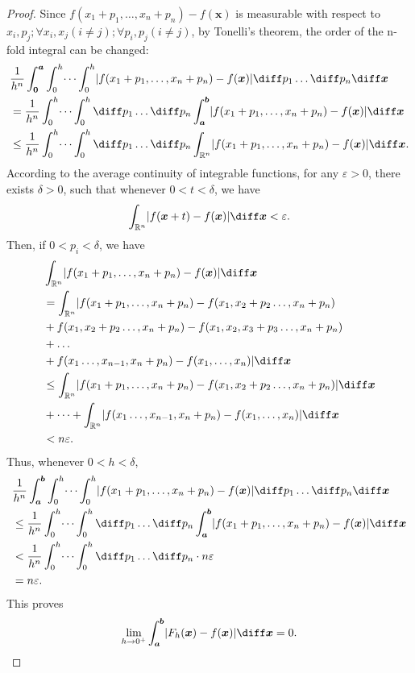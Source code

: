 \documentclass{ijclclp}
\begin{document}
\begin{proof}
    Since \(f(x_1+p_1,\dots,x_n+p_n)-f(\boldsymbol{x})\) is measurable with respect to \(x_i,p_j;\forall x_i,x_j(i\neq j);\forall p_i,p_j(i\neq j)\), by Tonelli's theorem, the order of the n-fold integral can be changed:
    \begin{align*}
        &\frac{1}{h^n}\int_{\boldsymbol{0}}^{\boldsymbol{a}}\int_0^h\dots\int_0^h\lvert f(x_1+p_1,\dots,x_n+p_n)-f(\boldsymbol{x})\rvert\diff p_1\dots\diff p_n\diff \boldsymbol{x}\\
        &=\frac{1}{h^n}\int_0^h\dots\int_0^h\diff p_1\dots\diff p_n\int_{\boldsymbol{a}}^{\boldsymbol{b}}\lvert f(x_1+p_1,\dots,x_n+p_n)-f(\boldsymbol{x})\rvert\diff \boldsymbol{x}\\
        &\leq\frac{1}{h^n}\int_0^h\dots\int_0^h\diff p_1\dots\diff p_n\int_{\mathbb{R}^n}\lvert f(x_1+p_1,\dots,x_n+p_n)-f(\boldsymbol{x})\rvert\diff \boldsymbol{x}.
    \end{align*}
    According to the average continuity of integrable functions, for any \(\varepsilon>0\), there exists \(\delta>0\), such that whenever \(0<t<\delta\), we have
    \[\int_{\mathbb{R}^n}\lvert f(\boldsymbol{x}+t)-f(\boldsymbol{x})\rvert\diff \boldsymbol{x}<\varepsilon.\]
    Then, if \(0<p_i<\delta\), we have
    \begin{align*}
        &\int_{\mathbb{R}^n}\lvert f(x_1+p_1,\dots,x_n+p_n)-f(\boldsymbol{x})\rvert\diff \boldsymbol{x}\\
        &=\int_{\mathbb{R}^n}\lvert f(x_1+p_1,\dots,x_n+p_n)-f(x_1,x_2+p_2\dots,x_n+p_n)\\
        &+f(x_1,x_2+p_2\dots,x_n+p_n)-f(x_1,x_2,x_3+p_3\dots,x_n+p_n)\\
        &+\dots\\
        &+f(x_1\dots,x_{n-1},x_n+p_n)-f(x_1,\dots,x_n)\rvert\diff \boldsymbol{x}\\
        &\leq \int_{\mathbb{R}^n}\lvert f(x_1+p_1,\dots,x_n+p_n)-f(x_1,x_2+p_2\dots,x_n+p_n)\rvert\diff \boldsymbol{x}\\
        &+\dots+\int_{\mathbb{R}^n}\lvert f(x_1\dots,x_{n-1},x_n+p_n)-f(x_1,\dots,x_n)\rvert\diff \boldsymbol{x}\\
        &< n\varepsilon.
    \end{align*}
    Thus, whenever \(0<h<\delta\),
    \begin{align*}
        &\frac{1}{h^n}\int_{\boldsymbol{a}}^{\boldsymbol{b}}\int_0^h\dots\int_0^h\lvert f(x_1+p_1,\dots,x_n+p_n)-f(\boldsymbol{x})\rvert\diff p_1\dots\diff p_n\diff \boldsymbol{x}\\
        &\leq\frac{1}{h^n}\int_0^h\dots\int_0^h\diff p_1\dots\diff p_n\int_{\boldsymbol{a}}^{\boldsymbol{b}}\lvert f(x_1+p_1,\dots,x_n+p_n)-f(\boldsymbol{x})\rvert\diff \boldsymbol{x}\\
        &<\frac{1}{h^n}\int_0^h\dots\int_0^h\diff p_1\dots\diff p_n\cdot n\varepsilon\\
        &=n\varepsilon.
    \end{align*}
    This proves
    \[\lim_{h\to0^+}\int_{\boldsymbol{a}}^{\boldsymbol{b}}\lvert F_h(\boldsymbol{x})-f(\boldsymbol{x})\rvert\diff \boldsymbol{x}=0.\]
\end{proof}
\end{document}
